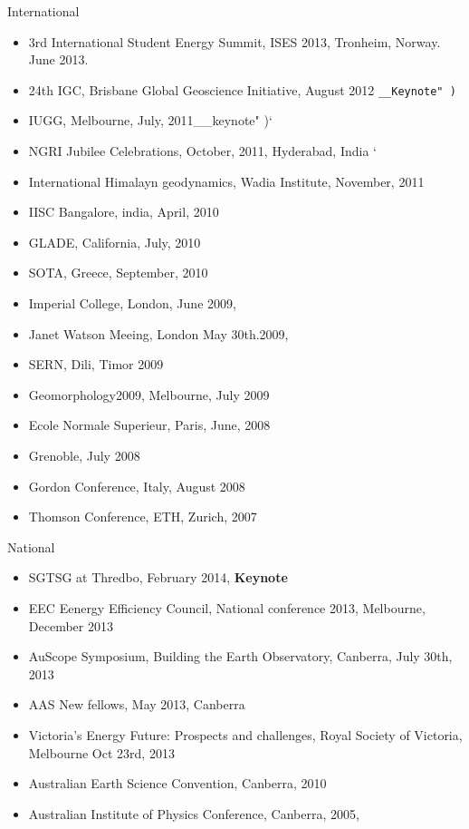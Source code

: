 \documentclass[
]{article}
\providecommand{\tightlist}{%
  \setlength{\itemsep}{0pt}\setlength{\parskip}{0pt}}
\begin{document}
International

\begin{itemize}
\tightlist
\item
  3rd International Student Energy Summit, ISES 2013, Tronheim, Norway.
  June 2013.
\item
  24th IGC, Brisbane Global Geoscience Initiative, August 2012
  \texttt{\_\_Keynote"\ )}
\item
  IUGG, Melbourne, July, 2011\_\_keynote" )`
\item
  NGRI Jubilee Celebrations, October, 2011, Hyderabad, India
  `
\item
  International Himalayn geodynamics, Wadia Institute, November, 2011
\item
  IISC Bangalore, india, April, 2010 
\item
  GLADE, California, July, 2010 
\item
  SOTA, Greece, September, 2010 
\item
  Imperial College, London, June 2009, 
\item
  Janet Watson Meeing, London May 30th.2009, 
\item
  SERN, Dili, Timor 2009 
\item
  Geomorphology2009, Melbourne, July 2009 
\item
  Ecole Normale Superieur, Paris, June, 2008 
\item
  Grenoble, July 2008 
\item
  Gordon Conference, Italy, August 2008 
\item
  Thomson Conference, ETH, Zurich, 2007 
\end{itemize}

National

\begin{itemize}
\tightlist
\item
  SGTSG at Thredbo, February 2014, \textbf{Keynote}
\item
  EEC Eenergy Efficiency Council, National conference 2013, Melbourne,
  December 2013 
\item
  AuScope Symposium, Building the Earth Observatory, Canberra, July
  30th, 2013 
\item
  AAS New fellows, May 2013, Canberra 
\item
  Victoria's Energy Future: Prospects and challenges, Royal Society of
  Victoria, Melbourne Oct 23rd, 2013 
\item
  Australian Earth Science Convention, Canberra, 2010
\item
  Australian Institute of Physics Conference, Canberra, 2005,
\end{itemize}
\end{document}
